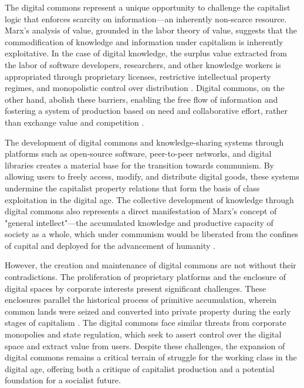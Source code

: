 \begin{refsection}
The digital commons represent a unique opportunity to challenge the capitalist logic that enforces scarcity on information—an inherently non-scarce resource. Marx’s analysis of value, grounded in the labor theory of value, suggests that the commodification of knowledge and information under capitalism is inherently exploitative. In the case of digital knowledge, the surplus value extracted from the labor of software developers, researchers, and other knowledge workers is appropriated through proprietary licenses, restrictive intellectual property regimes, and monopolistic control over distribution \cite[pp.~78]{benkler2010}. Digital commons, on the other hand, abolish these barriers, enabling the free flow of information and fostering a system of production based on need and collaborative effort, rather than exchange value and competition \cite[pp.~120-122]{fuchs2011}.

The development of digital commons and knowledge-sharing systems through platforms such as open-source software, peer-to-peer networks, and digital libraries creates a material base for the transition towards communism. By allowing users to freely access, modify, and distribute digital goods, these systems undermine the capitalist property relations that form the basis of class exploitation in the digital age. The collective development of knowledge through digital commons also represents a direct manifestation of Marx’s concept of "general intellect"—the accumulated knowledge and productive capacity of society as a whole, which under communism would be liberated from the confines of capital and deployed for the advancement of humanity \cite[pp.~289-290]{hardt2005}.

However, the creation and maintenance of digital commons are not without their contradictions. The proliferation of proprietary platforms and the enclosure of digital spaces by corporate interests present significant challenges. These enclosures parallel the historical process of primitive accumulation, wherein common lands were seized and converted into private property during the early stages of capitalism \cite[pp.~31-33]{bollier2016}. The digital commons face similar threats from corporate monopolies and state regulation, which seek to assert control over the digital space and extract value from users. Despite these challenges, the expansion of digital commons remains a critical terrain of struggle for the working class in the digital age, offering both a critique of capitalist production and a potential foundation for a socialist future.


\end{refsection}
